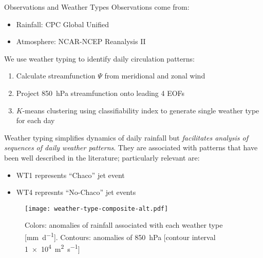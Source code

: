 \begin{block}{Observations and Weather Types}
  Observations come from:
  \begin{itemize}
    \item Rainfall: CPC Global Unified \cite{xie2010cpc}
    \item Atmosphere: NCAR-NCEP Reanalysis II \cite{Kanamitsu:2002kk}
  \end{itemize}
  We use weather typing \cite{Munoz2015} to identify daily circulation patterns:
  \begin{enumerate}
    \item Calculate streamfunction $\Psi$ from meridional and zonal wind \cite{Dawson:2016ge}
    \item Project \SI{850}{\hecto\pascal} streamfunction onto leading 4 EOFs
    \item $K$-means clustering using classifiability index \cite{Michelangeli1995} to generate single weather type for each day
  \end{enumerate}
  Weather typing simplifies dynamics of daily rainfall but \emph{facilitates analysis of sequences of daily weather patterns}.
  They are associated with patterns that have been well described in the literature; particularly relevant are:
  \begin{itemize}
    \item WT1 represents ``Chaco'' jet event \cite{Salio:2002ev}
    \item WT4 represnts ``No-Chaco'' jet events \cite{Vera:2006ib}
  \end{itemize}
  \begin{mdframed}
  \begin{figure}
  	\noindent\texttt{[image: weather-type-composite-alt.pdf]}
  	\caption{
  		Colors: anomalies of rainfall associated with each weather type [\si{\milli\meter\per\day}].
      Contours: anomalies of \SI{850}{\hecto\pascal} [contour interval \SI{1e4}{\meter\squared\per\second}]
  	}
    \label{fig:weather-types}
  \end{figure}
  \end{mdframed}
\end{block}
